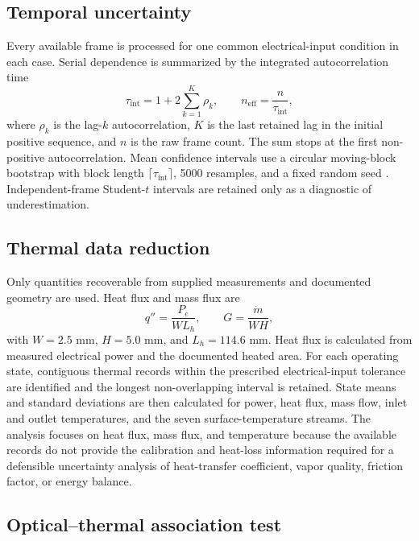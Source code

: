 \documentclass[preprint,12pt,sort&compress]{elsarticle}
\begin{document}
\subsection{Temporal uncertainty}

Every available frame is processed for one common electrical-input condition in each case. Serial dependence is summarized by the integrated autocorrelation time
\begin{equation}
\tau_{\mathrm{int}}=1+2\sum_{k=1}^{K}\rho_k,
\qquad n_{\mathrm{eff}}=\frac{n}{\tau_{\mathrm{int}}},
\label{eq:tau}
\end{equation}
where $\rho_k$ is the lag-$k$ autocorrelation, $K$ is the last retained lag in the initial positive sequence, and $n$ is the raw frame count. The sum stops at the first non-positive autocorrelation. Mean confidence intervals use a circular moving-block bootstrap with block length $\lceil\tau_{\mathrm{int}}\rceil$, 5000 resamples, and a fixed random seed \cite{Kunsch1989Bootstrap,Flyvbjerg1989Correlated}. Independent-frame Student-$t$ intervals are retained only as a diagnostic of underestimation.

\subsection{Thermal data reduction}

Only quantities recoverable from supplied measurements and documented geometry are used. Heat flux and mass flux are
\begin{equation}
q''=\frac{P_e}{W L_h}, \qquad G=\frac{\dot m}{W H},
\label{eq:thermal}
\end{equation}
with $W=2.5$ mm, $H=5.0$ mm, and $L_h=114.6$ mm. Heat flux is calculated from measured electrical power and the documented heated area. For each operating state, contiguous thermal records within the prescribed electrical-input tolerance are identified and the longest non-overlapping interval is retained. State means and standard deviations are then calculated for power, heat flux, mass flow, inlet and outlet temperatures, and the seven surface-temperature streams. The analysis focuses on heat flux, mass flux, and temperature because the available records do not provide the calibration and heat-loss information required for a defensible uncertainty analysis of heat-transfer coefficient, vapor quality, friction factor, or energy balance.

\subsection{Optical--thermal association test}
\end{document}
